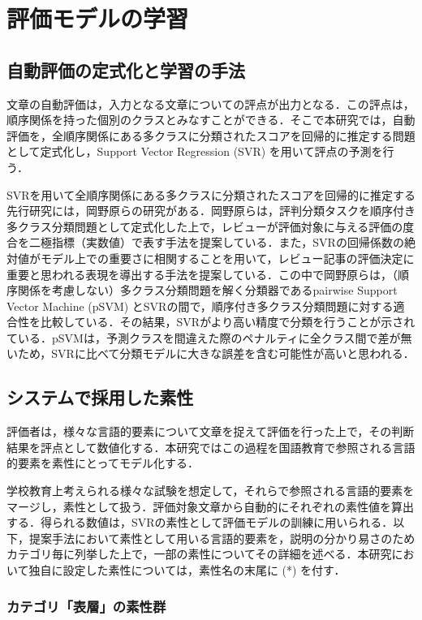 \documentclass[japanese]{jnlp_1.5}
\begin{document}
\section{評価モデルの学習}

\subsection{自動評価の定式化と学習の手法}

文章の自動評価は，入力となる文章についての評点が出力となる．この評点は，順序関係を持った個別のクラスとみなすことができる．そこで本研究では，自動評価を，全順序関係にある多クラスに分類されたスコアを回帰的に推定する問題として定式化し，Support Vector Regression (SVR) を用いて評点の予測を行う．

SVRを用いて全順序関係にある多クラスに分類されたスコアを回帰的に推定する先行研究には，岡野原らの研究\cite{OkanoharaTsujii2007}がある．岡野原らは，評判分類タスクを順序付き多クラス分類問題として定式化した上で，レビューが評価対象に与える評価の度合を二極指標（実数値）で表す手法を提案している．また，SVRの回帰係数の絶対値がモデル上での重要さに相関することを用いて，レビュー記事の評価決定に重要と思われる表現を導出する手法を提案している．この中で岡野原らは，（順序関係を考慮しない）多クラス分類問題を解く分類器であるpairwise Support Vector Machine (pSVM) \cite{Kresel1999}とSVRの間で，順序付き多クラス分類問題に対する適合性を比較している．その結果，SVRがより高い精度で分類を行うことが示されている．pSVMは，予測クラスを間違えた際のペナルティに全クラス間で差が無いため，SVRに比べて分類モデルに大きな誤差を含む可能性が高いと思われる．


\subsection{システムで採用した素性}

評価者は，様々な言語的要素について文章を捉えて評価を行った上で，その判断結果を評点として数値化する．本研究ではこの過程を国語教育で参照される言語的要素を素性にとってモデル化する．

学校教育上考えられる様々な試験を想定して，それらで参照される言語的要素をマージし，素性として扱う．評価対象文章から自動的にそれぞれの素性値を算出する．得られる数値は，SVRの素性として評価モデルの訓練に用いられる．以下，提案手法において素性として用いる言語的要素を，説明の分かり易さのためカテゴリ毎に列挙した上で，一部の素性についてその詳細を述べる．本研究において独自に設定した素性については，素性名の末尾に (*) を付す．


\subsubsection{カテゴリ「表層」の素性群}
\end{document}
